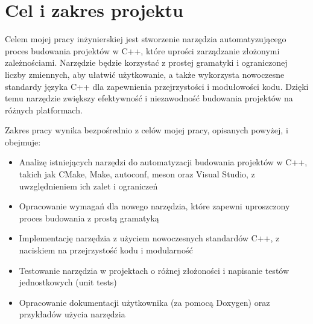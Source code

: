 \section{Cel i zakres projektu}
Celem mojej pracy inżynierskiej jest stworzenie narzędzia automatyzującego proces budowania projektów w C++, które uprości zarządzanie złożonymi zależnościami. Narzędzie będzie korzystać z prostej gramatyki i ograniczonej liczby zmiennych, aby ułatwić użytkowanie, a także wykorzysta nowoczesne standardy języka C++ dla zapewnienia przejrzystości i modułowości kodu. Dzięki temu narzędzie zwiększy efektywność i niezawodność budowania projektów na różnych platformach.

Zakres pracy wynika bezpośrednio z celów mojej pracy, opisanych powyżej, i obejmuje:
\begin{itemize}
    \item Analizę istniejących narzędzi do automatyzacji budowania projektów w C++, takich jak CMake, Make, autoconf, meson oraz Visual Studio, z uwzględnieniem ich zalet i ograniczeń
    \item Opracowanie wymagań dla nowego narzędzia, które zapewni uproszczony proces budowania z prostą gramatyką
    \item Implementację narzędzia z użyciem nowoczesnych standardów C++, z naciskiem na przejrzystość kodu i modularność
    \item Testowanie narzędzia w projektach o różnej złożoności i napisanie testów jednostkowych (unit tests)
    \item Opracowanie dokumentacji użytkownika (za pomocą Doxygen) oraz przykładów użycia narzędzia
\end{itemize}